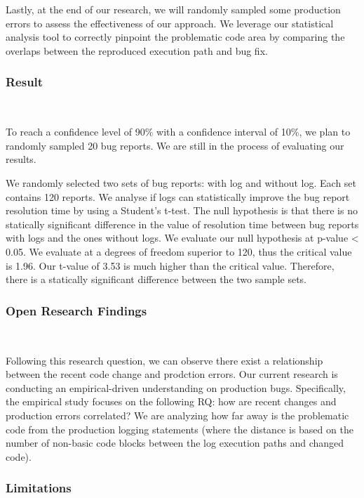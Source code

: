 		 Lastly, at the end of our research, we will randomly sampled some production errors to assess the effectiveness of our approach. We leverage our statistical analysis tool to correctly pinpoint the problematic code area by comparing the overlaps between the reproduced execution path and bug fix.
	~\\
	
	\subsubsection{Result}~ \label{rq1_result}

		To reach a confidence level of 90\% with a confidence interval of 10\%, we plan to randomly sampled 20 bug reports. We are still in the process of evaluating our results.

		 We randomly selected two sets of bug reports: with log and without log. Each set contains 120 reports. We analyse if logs can statistically improve the bug report resolution time by using a Student's t-test. The null hypothesis is that there is no statically significant difference in the value of resolution time between bug reports with logs and the ones without logs. We evaluate our null hypothesis at p-value < 0.05. We evaluate at a degrees of freedom superior to 120, thus the critical value is 1.96. Our t-value of 3.53 is much higher than the critical value. Therefore, there is a statically significant difference between the two sample sets. 
	~\\

	\subsubsection{Open Research Findings}~ \label{rq1_open_research}

		Following this research question, we can observe there exist a relationship between the recent code change and prodction errors. Our current research is conducting an empirical-driven understanding on production bugs. Specifically, the empirical study focuses on the following RQ: how are recent changes and production errors correlated? We are analyzing how far away is the problematic code from the production logging statements (where the distance is based on the number of non-basic code blocks between the log execution paths and changed code). 
	~\\
	
	\subsubsection{Limitations}~ \label{rq1_limitations}
	
